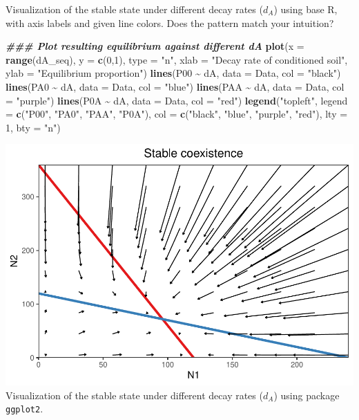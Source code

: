 \documentclass[
]{book}
\newenvironment{Shaded}{\begin{snugshade}}{\end{snugshade}}
\newcommand{\AttributeTok}[1]{\textcolor[rgb]{0.13,0.29,0.53}{#1}}
\newcommand{\DecValTok}[1]{\textcolor[rgb]{0.00,0.00,0.81}{#1}}
\newcommand{\DocumentationTok}[1]{\textcolor[rgb]{0.56,0.35,0.01}{\textbf{\textit{#1}}}}
\newcommand{\FunctionTok}[1]{\textcolor[rgb]{0.13,0.29,0.53}{\textbf{#1}}}
\newcommand{\NormalTok}[1]{#1}
\newcommand{\SpecialCharTok}[1]{\textcolor[rgb]{0.81,0.36,0.00}{\textbf{#1}}}
\newcommand{\StringTok}[1]{\textcolor[rgb]{0.31,0.60,0.02}{#1}}
\begin{document}
Visualization of the stable state under different decay rates (\(d_{A}\)) using base R, with axis labels and given line colors. Does the pattern match your intuition?

\begin{Shaded}
\begin{Highlighting}[]
\DocumentationTok{\#\#\# Plot resulting equilibrium against different dA  }
\FunctionTok{plot}\NormalTok{(}\AttributeTok{x =} \FunctionTok{range}\NormalTok{(dA\_seq), }\AttributeTok{y =} \FunctionTok{c}\NormalTok{(}\DecValTok{0}\NormalTok{,}\DecValTok{1}\NormalTok{), }\AttributeTok{type =} \StringTok{"n"}\NormalTok{, }
     \AttributeTok{xlab =} \StringTok{"Decay rate of conditioned soil"}\NormalTok{, }
     \AttributeTok{ylab =} \StringTok{"Equilibrium proportion"}\NormalTok{)}
\FunctionTok{lines}\NormalTok{(P00 }\SpecialCharTok{\textasciitilde{}}\NormalTok{ dA, }\AttributeTok{data =}\NormalTok{ Data, }\AttributeTok{col =} \StringTok{"black"}\NormalTok{)}
\FunctionTok{lines}\NormalTok{(PA0 }\SpecialCharTok{\textasciitilde{}}\NormalTok{ dA, }\AttributeTok{data =}\NormalTok{ Data, }\AttributeTok{col =} \StringTok{"blue"}\NormalTok{)}
\FunctionTok{lines}\NormalTok{(PAA }\SpecialCharTok{\textasciitilde{}}\NormalTok{ dA, }\AttributeTok{data =}\NormalTok{ Data, }\AttributeTok{col =} \StringTok{"purple"}\NormalTok{)}
\FunctionTok{lines}\NormalTok{(P0A }\SpecialCharTok{\textasciitilde{}}\NormalTok{ dA, }\AttributeTok{data =}\NormalTok{ Data, }\AttributeTok{col =} \StringTok{"red"}\NormalTok{)}
\FunctionTok{legend}\NormalTok{(}\StringTok{"topleft"}\NormalTok{, }
       \AttributeTok{legend =} \FunctionTok{c}\NormalTok{(}\StringTok{"P00"}\NormalTok{, }\StringTok{"PA0"}\NormalTok{, }\StringTok{"PAA"}\NormalTok{, }\StringTok{"P0A"}\NormalTok{), }
       \AttributeTok{col =} \FunctionTok{c}\NormalTok{(}\StringTok{"black"}\NormalTok{, }\StringTok{"blue"}\NormalTok{, }\StringTok{"purple"}\NormalTok{, }\StringTok{"red"}\NormalTok{), }\AttributeTok{lty =} \DecValTok{1}\NormalTok{, }\AttributeTok{bty =} \StringTok{"n"}\NormalTok{)}
\end{Highlighting}
\end{Shaded}

\includegraphics{bookdown-demo_files/figure-latex/unnamed-chunk-26-1.pdf}
Visualization of the stable state under different decay rates (\(d_{A}\)) using package \texttt{ggplot2}.
\end{document}
